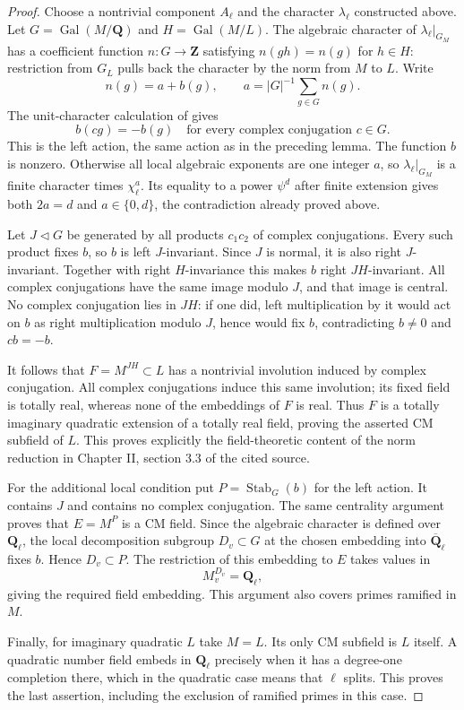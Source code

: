 \documentclass[11pt,oneside]{article}
\begin{document}
\begin{proof}
Choose a nontrivial component $A_\ell$ and the
character $\lambda_\ell$ constructed above. Let
$G=\operatorname{Gal}(M/\mathbf Q)$ and
$H=\operatorname{Gal}(M/L)$. The algebraic character
of $\lambda_\ell|_{G_M}$ has a coefficient function
$n:G\to\mathbf Z$ satisfying $n(gh)=n(g)$ for
$h\in H$: restriction from $G_L$ pulls back the
character by the norm from $M$ to $L$. Write
\[
 n(g)=a+b(g),\qquad
 a=|G|^{-1}\sum_{g\in G}n(g).
\]
The unit-character calculation of
\cite[Chapter II, section 3.1, pp.~II--29--30]{A_SerreAbelian}
gives
\[
 b(cg)=-b(g)
 \quad\text{for every complex conjugation }c\in G.
\]
This is the left action, the same action as in the
preceding lemma. The function $b$ is nonzero.
Otherwise all local algebraic exponents are one
integer $a$, so $\lambda_\ell|_{G_M}$ is a finite
character times $\chi_\ell^a$. Its equality to a
power $\psi^d$ after finite extension gives both
$2a=d$ and $a\in\{0,d\}$, the contradiction already
proved above.

Let $J\lhd G$ be generated by all products $c_1c_2$
of complex conjugations. Every such product fixes
$b$, so $b$ is left $J$-invariant. Since $J$ is
normal, it is also right $J$-invariant. Together
with right $H$-invariance this makes $b$ right
$JH$-invariant. All complex conjugations have the
same image modulo $J$, and that image is central.
No complex conjugation lies in $JH$: if one did,
left multiplication by it would act on $b$ as
right multiplication modulo $J$, hence would fix
$b$, contradicting $b\ne0$ and $cb=-b$.

It follows that $F=M^{JH}\subset L$ has a
nontrivial involution induced by complex conjugation.
All complex conjugations induce this same involution;
its fixed field is totally real, whereas none of
the embeddings of $F$ is real. Thus $F$ is a
totally imaginary quadratic extension of a totally
real field, proving the asserted CM subfield of $L$.
This proves explicitly the field-theoretic content
of the norm reduction in Chapter II, section 3.3
of the cited source.

For the additional local condition put
$P=\operatorname{Stab}_G(b)$ for the left action.
It contains $J$ and contains no complex conjugation.
The same centrality argument proves that
$E=M^P$ is a CM field. Since the algebraic
character is defined over $\mathbf Q_\ell$, the
local decomposition subgroup $D_v\subset G$ at
the chosen embedding into $\overline{\mathbf Q}_\ell$
fixes $b$. Hence $D_v\subset P$. The restriction
of this embedding to $E$ takes values in
\[
                        M_v^{D_v}=\mathbf Q_\ell,
\]
giving the required field embedding. This argument
also covers primes ramified in $M$.

Finally, for imaginary quadratic $L$ take $M=L$.
Its only CM subfield is $L$ itself. A quadratic
number field embeds in $\mathbf Q_\ell$ precisely
when it has a degree-one completion there, which
in the quadratic case means that $\ell$ splits.
This proves the last assertion, including the
exclusion of ramified primes in this case.
\end{proof}
\end{document}
